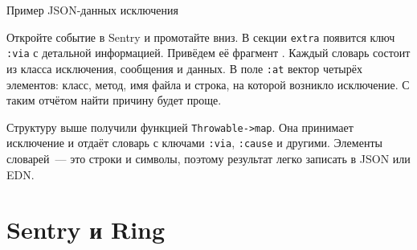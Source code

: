 \begin{listing}[ht!]

\ifx\DEVICETYPE\MOBILE

\begin{english}
  \begin{json}
  \end{json}
\end{english}

\else

\begin{english}
  \begin{json}
  \end{json}
\end{english}

\fi

  \caption{Пример JSON-данных исключения}
  \label{fig:ex-json-data}
\end{listing}

Откройте событие в Sentry и промотайте вниз. В секции \verb|extra| появится ключ
\verb|:via| с детальной информацией. Привёдем её фрагмент .
Каждый словарь состоит из класса исключения, сообщения и данных. В поле \verb|:at|
вектор четырёх элементов: класс, метод, имя файла и строка, на которой возникло
исключение. С таким отчётом найти причину будет проще.


Структуру выше получили функцией \texttt{Throw\-able->map}. Она принимает
исключение и отдаёт словарь с ключами \verb|:via|, \verb|:cause| и
другими. Элементы словарей~--- это строки и символы, поэтому результат легко
записать в JSON или EDN.

\section{Sentry и Ring}

